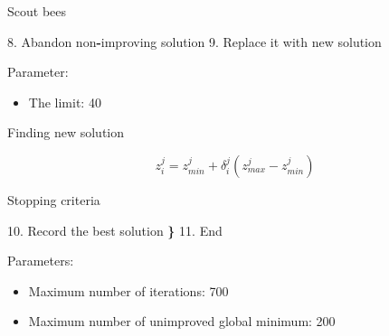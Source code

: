 \documentclass[14pt,ignorenonframetext,compress]{beamer}
\newenvironment{Shaded}{\begin{snugshade}}{\end{snugshade}}
\newcommand{\ErrorTok}[1]{\textcolor[rgb]{0.64,0.00,0.00}{\textbf{#1}}}
\newcommand{\FloatTok}[1]{\textcolor[rgb]{0.00,0.00,0.81}{#1}}
\newcommand{\NormalTok}[1]{#1}
\newcommand{\OperatorTok}[1]{\textcolor[rgb]{0.81,0.36,0.00}{\textbf{#1}}}
\providecommand{\tightlist}{%
  \setlength{\itemsep}{0pt}\setlength{\parskip}{0pt}}
\renewenvironment{Shaded}{\color{black}\begin{snugshade}\color{black}}{\end{snugshade}}
\begin{document}
\begin{frame}[fragile]{Scout bees}
\protect\hypertarget{scout-bees}{}

\begin{Shaded}
\begin{Highlighting}[]
 \FloatTok{8.}\NormalTok{ Abandon non}\OperatorTok{-}\NormalTok{improving solution }
 \FloatTok{9.}\NormalTok{ Replace it with new solution}
\end{Highlighting}
\end{Shaded}

Parameter:

\begin{itemize}
\tightlist
\item
  The limit: 40
\end{itemize}

\pause

\begin{block}{Finding new solution}

\[z_i^j = z_{min}^j + \delta_i^j(z_{max}^j-z_{min}^j)\]

\end{block}

\end{frame}

\begin{frame}[fragile]{Stopping criteria}
\protect\hypertarget{stopping-criteria}{}

\begin{Shaded}
\begin{Highlighting}[]
\FloatTok{10.}\NormalTok{ Record the best solution }\ErrorTok{\}}
\FloatTok{11.}\NormalTok{ End}
\end{Highlighting}
\end{Shaded}

Parameters:

\begin{itemize}
\tightlist
\item
  Maximum number of iterations: 700
\item
  Maximum number of unimproved global minimum: 200
\end{itemize}

\end{frame}
\end{document}
